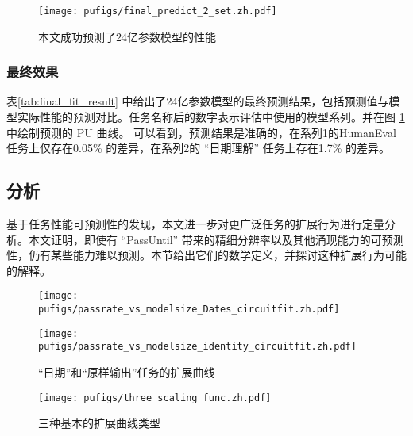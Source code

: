 \begin{figure}[!htbp]
    \centering
    \texttt{[image: pufigs/final\_predict\_2\_set.zh.pdf]}
    \caption{本文成功预测了24亿参数模型的性能}
    \label{fig:final_curve_humaneval_series1} 
\end{figure}


\subsubsection{最终效果}
\begin{table}[!htbp]
    \centering
    \caption{本文任务性能可预测方法的最终效果}
    \label{tab:final_fit_result}
\end{table}



表\ref{tab:final_fit_result} 中给出了24亿参数模型的最终预测结果，包括预测值与模型实际性能的预测对比。任务名称后的数字表示评估中使用的模型系列。并在图 \ref{fig:final_curve_humaneval_series1} 中绘制预测的 \textsc{PU} 曲线。 可以看到，预测结果是准确的，在系列1的HumanEval任务上仅存在0.05\% 的差异，在系列2的 “日期理解” 任务上存在1.7\% 的差异。 


\subsection{分析}
\label{sec:emergent}

{基于任务性能可预测性的发现，本文进一步对更广泛任务的扩展行为进行定量分析。本文证明，即使有 “PassUntil” 带来的精细分辨率以及其他涌现能力的可预测性，仍有某些能力难以预测。本节给出它们的数学定义，并探讨这种扩展行为可能的解释。}
\begin{figure}
    \centering
        \centering
        \texttt{[image: pufigs/passrate\_vs\_modelsize\_Dates\_circuitfit.zh.pdf]}
        \centering
\end{figure}
\begin{figure}
        \texttt{[image: pufigs/passrate\_vs\_modelsize\_identity\_circuitfit.zh.pdf]}
        \caption{“日期”和“原样输出”任务的扩展曲线}
        \label{fig:unnatural}
\end{figure}
\begin{figure}
    \centering
    \texttt{[image: pufigs/three\_scaling\_func.zh.pdf]}
    \caption{三种基本的扩展曲线类型}
    \label{fig:threekindsofgrowth}
\end{figure}

